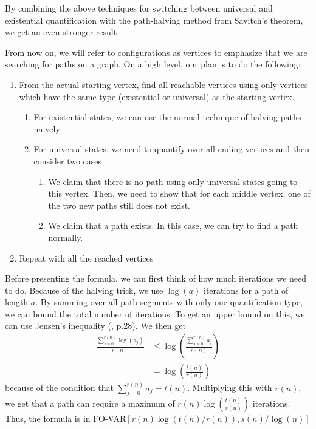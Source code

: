 By combining the above techniques for switching between universal and existential quantification with the path-halving method from Savitch's theorem, we get an even stronger result.

From now on, we will refer to configurations as vertices to emphasize that we are searching for paths on a graph.
On a high level, our plan is to do the following:
\begin{enumerate}
    \setlength\itemsep{0.2em}
    \item From the actual starting vertex, find all reachable vertices using only vertices which have the same type (existential or universal) as the starting vertex.
    \begin{enumerate}
        \item For existential states, we can use the normal technique of halving paths naively
        \item For universal states, we need to quantify over all ending vertices and then consider two cases
        \begin{enumerate}
            \item We claim that there is no path using only universal states going to this vertex.
            Then, we need to show that for each middle vertex, one of the two new paths still does not exist.
            \item We claim that a path exists.
            In this case, we can try to find a path normally.
        \end{enumerate}
    \end{enumerate}
    \item Repeat with all the reached vertices
\end{enumerate}

Before presenting the formula, we can first think of how much iterations we need to do.
Because of the halving trick, we use $\log(a)$ iterations for a path of length $a$.
By summing over all path segments with only one quantification type, we can bound the total number of iterations.
To get an upper bound on this, we can use Jensen's inequality (\cite{inequalities-math-oly}, p.28).
We then get
\[
    \begin{aligned}
        \frac{\sum_{j = 0}^{r(n)}\log(a_{j})}{r(n)} &\leq \log\left(\frac{\sum_{j= 0}^{r(n)}a_{j}}{r(n)} \right)  \\
        &= \log\left(\frac{t(n)}{r(n)} \right)
    \end{aligned}
\]
because of the condition that $\sum_{j= 0}^{r(n)}a_{j} = t(n)$.
Multiplying this with $r(n)$, we get that a path can require a maximum of $r(n)\log\left(\frac{t(n)}{r(n)} \right)$ iterations.
Thus, the formula is in FO-VAR$\left[r(n)\log\left(t(n)/r(n) \right), s(n)/\log(n) \right]$



